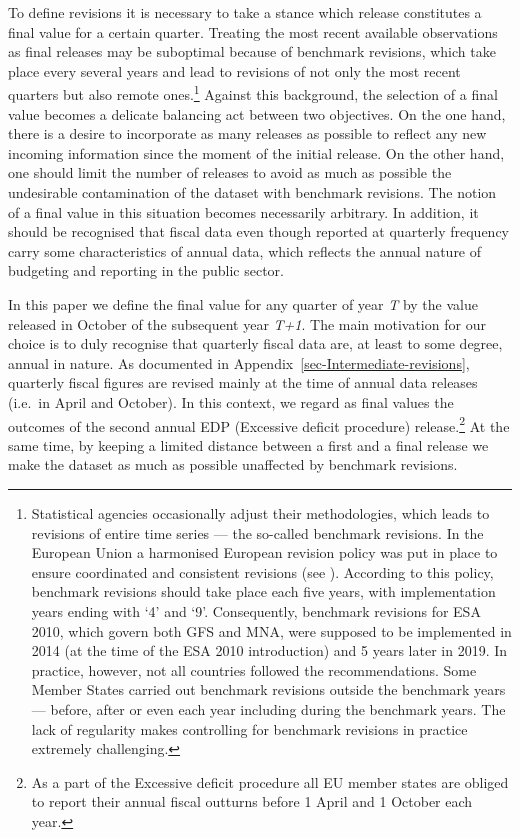 \documentclass[
  letterpaper,
  authoryear,
  preprint,
  3p]{elsarticle}
\begin{document}
To define revisions it is necessary to take a stance which release
constitutes a final value for a certain quarter. Treating the most
recent available observations as final releases may be suboptimal
because of benchmark revisions, which take place every several years and
lead to revisions of not only the most recent quarters but also remote
ones.\footnote{Statistical agencies occasionally adjust their
  methodologies, which leads to revisions of entire time series --- the
  so-called benchmark revisions. In the European Union a harmonised
  European revision policy was put in place to ensure coordinated and
  consistent revisions (see \citet{ec_revision_guidelines}). According
  to this policy, benchmark revisions should take place each five years,
  with implementation years ending with `4' and `9'. Consequently,
  benchmark revisions for ESA 2010, which govern both GFS and MNA, were
  supposed to be implemented in 2014 (at the time of the ESA 2010
  introduction) and 5 years later in 2019. In practice, however, not all
  countries followed the recommendations. Some Member States carried out
  benchmark revisions outside the benchmark years --- before, after or
  even each year including during the benchmark years. The lack of
  regularity makes controlling for benchmark revisions in practice
  extremely challenging.} Against this background, the selection of a
final value becomes a delicate balancing act between two objectives. On
the one hand, there is a desire to incorporate as many releases as
possible to reflect any new incoming information since the moment of the
initial release. On the other hand, one should limit the number of
releases to avoid as much as possible the undesirable contamination of
the dataset with benchmark revisions. The notion of a final value in
this situation becomes necessarily arbitrary. In addition, it should be
recognised that fiscal data even though reported at quarterly frequency
carry some characteristics of annual data, which reflects the annual
nature of budgeting and reporting in the public sector.

In this paper we define the final value for any quarter of year \emph{T}
by the value released in October of the subsequent year \emph{T+1}. The
main motivation for our choice is to duly recognise that quarterly
fiscal data are, at least to some degree, annual in nature. As
documented in Appendix~\ref{sec-Intermediate-revisions}, quarterly
fiscal figures are revised mainly at the time of annual data releases
(i.e.~in April and October). In this context, we regard as final values
the outcomes of the second annual EDP (Excessive deficit procedure)
release.\footnote{As a part of the Excessive deficit procedure all EU
  member states are obliged to report their annual fiscal outturns
  before 1 April and 1 October each year.} At the same time, by keeping
a limited distance between a first and a final release we make the
dataset as much as possible unaffected by benchmark revisions.
\end{document}
